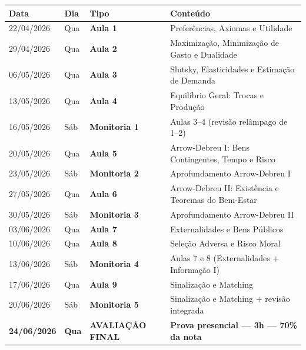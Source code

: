 \documentclass[11pt,a4paper]{article}
\begin{document}
\begin{center}
\begin{tabular}{@{}p{2.4cm}p{1.2cm}p{3cm}p{7.5cm}@{}}
\toprule
\textbf{Data} & \textbf{Dia} & \textbf{Tipo} & \textbf{Conteúdo} \\
\midrule
22/04/2026 & Qua & \textcolor{insperred}{\textbf{Aula 1}}    & Preferências, Axiomas e Utilidade \\
29/04/2026 & Qua & \textcolor{insperred}{\textbf{Aula 2}}    & Maximização, Minimização de Gasto e Dualidade \\
06/05/2026 & Qua & \textcolor{insperred}{\textbf{Aula 3}}    & Slutsky, Elasticidades e Estimação de Demanda \\
13/05/2026 & Qua & \textcolor{insperred}{\textbf{Aula 4}}    & Equilíbrio Geral: Trocas e Produção \\
16/05/2026 & Sáb & \textcolor{monitoriablue}{\textbf{Monitoria 1}} & Aulas 3--4 (revisão relâmpago de 1--2) \\
20/05/2026 & Qua & \textcolor{insperred}{\textbf{Aula 5}}    & Arrow-Debreu I: Bens Contingentes, Tempo e Risco \\
23/05/2026 & Sáb & \textcolor{monitoriablue}{\textbf{Monitoria 2}} & Aprofundamento Arrow-Debreu I \\
27/05/2026 & Qua & \textcolor{insperred}{\textbf{Aula 6}}    & Arrow-Debreu II: Existência e Teoremas do Bem-Estar \\
30/05/2026 & Sáb & \textcolor{monitoriablue}{\textbf{Monitoria 3}} & Aprofundamento Arrow-Debreu II \\
03/06/2026 & Qua & \textcolor{insperred}{\textbf{Aula 7}}    & Externalidades e Bens Públicos \\
10/06/2026 & Qua & \textcolor{insperred}{\textbf{Aula 8}}    & Seleção Adversa e Risco Moral \\
13/06/2026 & Sáb & \textcolor{monitoriablue}{\textbf{Monitoria 4}} & Aulas 7 e 8 (Externalidades + Informação I) \\
17/06/2026 & Qua & \textcolor{insperred}{\textbf{Aula 9}}    & Sinalização e Matching \\
20/06/2026 & Sáb & \textcolor{monitoriablue}{\textbf{Monitoria 5}} & Sinalização e Matching $+$ revisão integrada \\
\midrule
\textbf{24/06/2026} & \textbf{Qua} & \textcolor{insperred}{\textbf{\large AVALIAÇÃO FINAL}} & \textbf{Prova presencial --- 3h --- 70\% da nota} \\
\bottomrule
\end{tabular}
\end{center}
\end{document}
